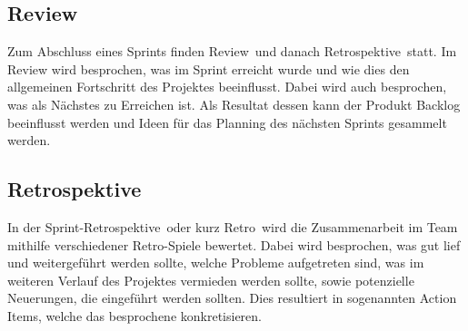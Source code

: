 \subsection{Review}
Zum Abschluss eines Sprints finden \glqq Review\grqq~und danach \glqq Retrospektive\grqq~statt. Im Review wird besprochen, was im Sprint erreicht 
wurde und wie dies den allgemeinen Fortschritt des Projektes beeinflusst. Dabei wird auch besprochen, was als Nächstes zu Erreichen ist. 
Als Resultat dessen kann der Produkt Backlog beeinflusst werden und Ideen für das Planning des nächsten Sprints gesammelt werden. 

\subsection{Retrospektive}
In der \glqq Sprint-Retrospektive\grqq~oder kurz \glqq Retro\grqq~wird die Zusammenarbeit im Team mithilfe verschiedener Retro-Spiele bewertet. 
Dabei wird besprochen, was gut lief und weitergeführt werden sollte, welche Probleme aufgetreten sind, was im weiteren Verlauf des Projektes 
vermieden werden sollte, sowie potenzielle Neuerungen, die eingeführt werden sollten. Dies resultiert in sogenannten Action Items, welche das 
besprochene konkretisieren.

